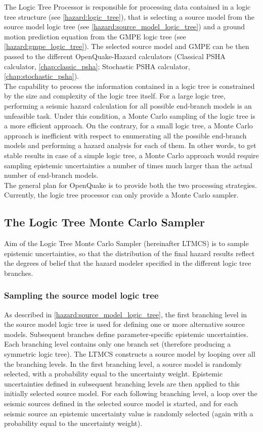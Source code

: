 The Logic Tree Processor is responsible for processing data contained in a logic tree structure (see \ref{hazard:logic_tree}), that is selecting a source model from the source model logic tree (see \ref{hazard:source_model_logic_tree}) and a ground motion prediction equation from the GMPE logic tree (see \ref{hazard:gmpe_logic_tree}). The selected source model and GMPE can be then passed to the different OpenQuake-Hazard calculators (Classical PSHA calculator, \ref{chap:classic_psha}; Stochastic PSHA calculator, \ref{chap:stochastic_psha}).\\
The capability to process the information contained in a logic tree is constrained by the size and complexity of the logic tree itself. For a large logic tree, performing a seismic hazard calculation for all possible end-branch models is an unfeasible task. Under this condition, a Monte Carlo sampling of the logic tree is a more efficient approach. On the contrary, for a small logic tree, a Monte Carlo approach is inefficient with respect to enumerating all the possible end-branch models and performing a hazard analysis for each of them. In other words, to get stable results in case of a simple logic tree,  a Monte Carlo approach would require sampling epistemic uncertainties a number of times much larger than the actual number of end-branch models.\\
The general plan for OpenQuake is to provide both the two processing strategies. Currently, the logic tree processor can only provide a Monte Carlo sampler.
\subsection{The Logic Tree Monte Carlo Sampler}
Aim of the Logic Tree Monte Carlo Sampler (hereinafter LTMCS) is to sample epistemic uncertainties, so that the distribution of the final hazard results reflect the degrees of belief that the hazard modeler specified in the different logic tree branches.\\
\subsubsection{Sampling the source model logic tree}
As described in \ref{hazard:source_model_logic_tree}, the first branching level in the source model logic tree is used for defining one or more alternative source models. Subsequent branches define parameter-specific epistemic uncertainties. Each branching level contains only one branch set (therefore producing a symmetric logic tree). The LTMCS constructs a source model by looping over all the branching levels. In the first branching level, a source model is randomly selected, with a probability equal to the uncertainty weight. Epistemic uncertainties defined in subsequent branching levels are then applied to this initially selected source model. For each following branching level, a loop over the seismic sources defined in the selected source model is started, and for each seismic source an epistemic uncertainty value is randomly selected (again with a probability equal to the uncertainty weight).